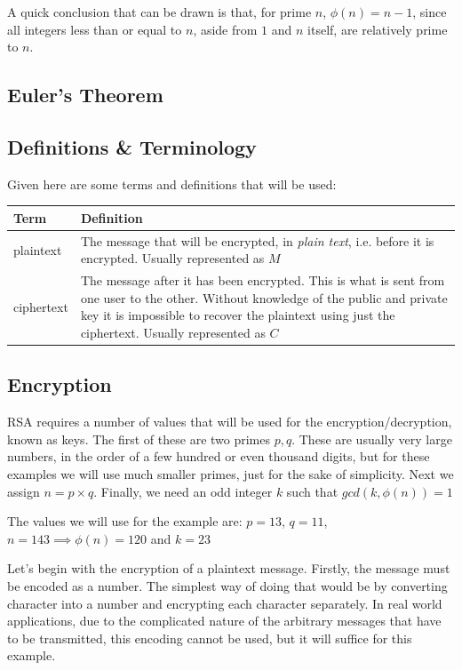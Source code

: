 \documentclass[12pt, titlepage]{article}
\begin{document}
    A quick conclusion that can be drawn is that, for prime $n$, $\phi(n) = n -
    1$, since all integers less than or equal to $n$, aside from $1$ and $n$
    itself, are relatively prime to $n$.

    \subsection{Euler's Theorem}
    \subsection{Definitions \& Terminology}
    Given here are some terms and definitions that will be used:
    \begin{table}[H]
        \begin{tabular}{ | m{5em} | p{30em} | }
            \hline
            Term      & Definition\\
            \hline
            plaintext & The message that will be encrypted, in \emph{plain
                        text}, i.e. before it is encrypted. Usually represented as $M$\\
            \hline
            ciphertext & The message after it has been encrypted. This is what
                         is sent from one user to the other. Without
                         knowledge of the public and private key it is
                         impossible to recover the plaintext using just the
                         ciphertext. Usually represented as $C$\\
            \hline
        \end{tabular}
    \end{table}
    \subsection{Encryption}
    RSA requires a number of values that will be used for the
    encryption/decryption, known as keys.  The first of these are two primes
    $p,q$. These are usually very large numbers, in the order of a few hundred
    or even thousand digits, but for these examples we will use much smaller
    primes, just for the sake of simplicity. Next we assign $n=p \times q$.
    Finally, we need an odd integer $k$ such that $gcd(k, \phi (n)) = 1$ 

    The values we will use for the example are: $p=13$, $q=11$, $n=143 \implies
    \phi (n) = 120$ and $k = 23$

    Let's begin with the encryption of a plaintext message. Firstly, the message
    must be encoded as a number. The simplest way of doing that would be by
    converting character into a number and encrypting each character separately.
    In real world applications, due to the complicated nature of the arbitrary
    messages that have to be transmitted, this encoding cannot be used, but it
    will suffice for this example.
\end{document}
